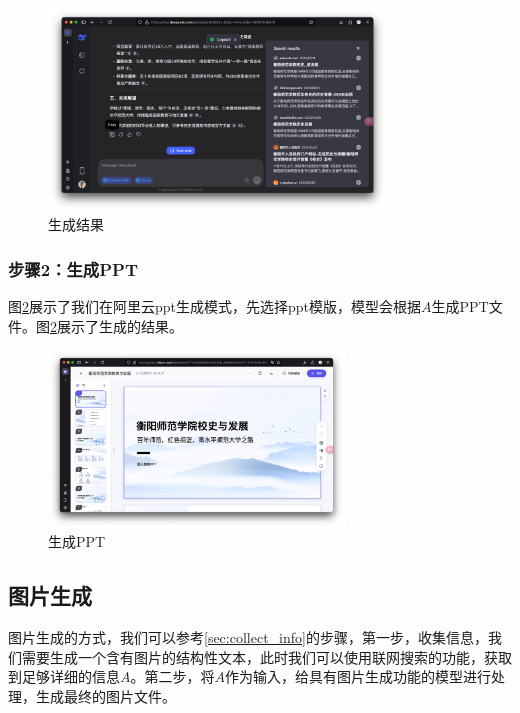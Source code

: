 \documentclass{article}
\begin{document}
\begin{figure}[htbp]
  \centering
  \includegraphics[width=0.8\textwidth]{./fig/search-result.png}
  \caption{生成结果}
  \label{fig:generate_result}
\end{figure}

\subsubsection{步骤2：生成PPT}
图\ref{fig:generate_ppt}展示了我们在阿里云ppt生成模式，先选择ppt模版，模型会根据$A$生成PPT文件。图\ref{fig:generate_ppt}展示了生成的结果。
\begin{figure}[htbp]
  \centering
  \includegraphics[width=0.7\textwidth]{./fig/ppt.png}
  \caption{生成PPT}
  \label{fig:generate_ppt}
\end{figure}

\subsection{图片生成}

图片生成的方式，我们可以参考\ref{sec:collect_info}的步骤，第一步，收集信息，我们需要生成一个含有图片的结构性文本，此时我们可以使用联网搜索的功能，获取到足够详细的信息$A$。第二步，将$A$作为输入，给具有图片生成功能的模型进行处理，生成最终的图片文件。
\end{document}

